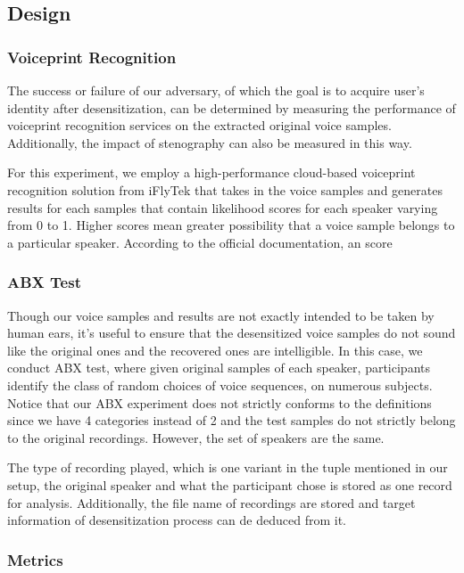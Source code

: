 \documentclass[conference]{IEEEtran}
\begin{document}
\subsection{Design}

\subsubsection{Voiceprint Recognition}

The success or failure of our adversary, of which the goal is to acquire user's identity after desensitization, can be determined by measuring the performance of voiceprint recognition services on the extracted original voice samples. Additionally, the impact of stenography can also be measured in this way.

For this experiment, we employ a high-performance cloud-based voiceprint recognition solution from iFlyTek that takes in the voice samples and generates results for each samples that contain likelihood scores for each speaker varying from 0 to 1. Higher scores mean greater possibility that a voice sample belongs to a particular speaker. According to the official documentation, an score

\subsubsection{ABX Test}

Though our voice samples and results are not exactly intended to be taken by human ears, it's useful to ensure that the desensitized voice samples do not sound like the original ones and the recovered ones are intelligible. In this case, we conduct ABX test, where given original samples of each speaker, participants identify the class of random choices of voice sequences, on numerous subjects. Notice that our ABX experiment does not strictly conforms to the definitions since we have 4 categories instead of 2 and the test samples do not strictly belong to the original recordings. However, the set of speakers are the same.

The type of recording played, which is one variant in the tuple mentioned in our setup, the original speaker and what the participant chose is stored as one record for analysis. Additionally, the file name of recordings are stored and target information of desensitization process can de deduced from it.

\subsubsection{Metrics}
\end{document}
